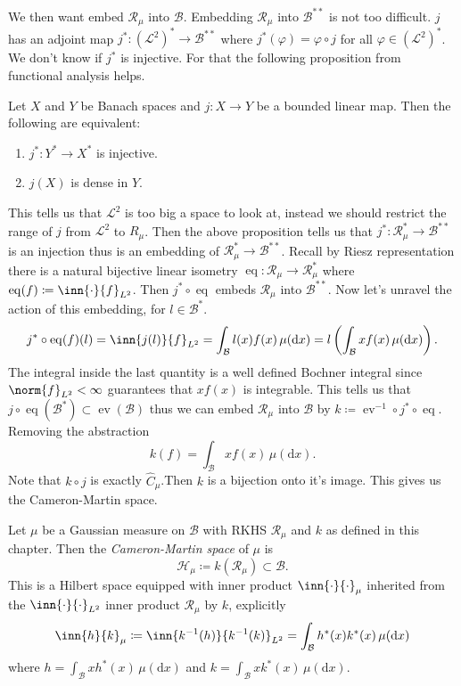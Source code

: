 \documentclass[fontsize=12pt, DIV=10]{scrreprt}
\theoremstyle{remark}
\newcommand{\defeq}{\coloneqq}
\newcommand{\calB}{\mathcal B}
\newcommand{\calH}{\mathcal H}
\newcommand{\calL}{\mathcal L}
\newcommand{\calR}{\mathcal R}
\newcommand{\dif}[1]{\text{d} #1}
\DeclareMathOperator{\ev}{ev}
\DeclareMathOperator{\eq}{eq}
\renewcommand{\phi}{\varphi}
\newcommand{\mudif}{\ensuremath{\, \mu(\dif x)}}
\begin{document}
We then want embed $\calR_{\mu}$ into $\calB$. Embedding $\calR_{\mu}$ into $\calB^{**}$ is not too difficult. $j$ has an adjoint map $j^*: (\calL^2)^* \to \calB^{**}$ where $j^*(\phi) = \phi \circ j$ for all $\phi \in (\calL^2)^*$. We don't know if $j^*$ is injective. For that the following proposition from functional analysis helps.
\begin{prop}
	Let $X$ and $Y$ be Banach spaces and $j:X \to Y$ be a bounded linear map. Then the following are equivalent:
	\begin{enumerate}
		\item $j^*: Y^* \to X^*$ is injective.
		\item $j(X)$ is dense in $Y$.
	\end{enumerate}
\end{prop}
This tells us that $\calL^2$ is too big a space to look at, instead we should restrict the range of $j$ from $\calL^2$ to $R_{\mu}$. Then the above proposition tells us that $j^*: \calR_{\mu}^* \to \calB^{**}$ is an injection thus is an embedding of $\calR_{\mu}^* \to \calB^{**}$. Recall by Riesz representation there is a natural bijective linear isometry $\eq : \calR_{\mu} \to \calR_{\mu}^*$ where $\eq(f) \defeq \inn{\cdot}{f}_{L^2}$. Then $j^* \circ \eq$ embeds $\calR_{\mu}$ into $\calB^{**}$. Now let's unravel the action of this embedding, for $l \in \calB^*$.
\begin{align}
	j^* \circ \eq (f)(l) = \inn{j(l)}{f}_{L^2} = \int_{\calB} l(x) f(x) \mudif = l\left(\int_{\calB} x f(x) \mudif \right).
\end{align}
The integral inside the last quantity is a well defined Bochner integral since $\norm{f}_{L^2} < \infty$ guarantees that $x f(x)$ is integrable. This tells us that $j \circ \eq(\calB^*) \subset \ev(\calB)$ thus we can embed $\calR_{\mu}$ into $\calB$ by $k \defeq \ev^{-1} \circ j^* \circ \eq$. Removing the abstraction
\begin{equation}
	k(f) = \int_{\calB} x f(x) \mudif.
\end{equation}
Note that $k \circ j$ is exactly $\hat{C}_{\mu}$.Then $k$ is a bijection onto it's image. This gives us the Cameron-Martin space.
\begin{defn}
	Let $\mu$ be a Gaussian measure on $\calB$ with RKHS $\calR_{\mu}$ and $k$ as defined in this chapter. Then the \emph{Cameron-Martin space} of $\mu$ is
	\begin{equation}
		\calH_{\mu} \defeq k(\calR_{\mu}) \subset \calB.
	\end{equation}
	This is a Hilbert space equipped with inner product $\inn{\cdot}{\cdot}_{\mu}$ inherited from the $\inn{\cdot}{\cdot}_{L^2}$ inner product $\calR_{\mu}$ by $k$, explicitly
	\begin{equation}
		\inn{h}{k}_{\mu} \defeq \inn{k^{-1}(h)}{k^{-1}(k)}_{L^2}
		= \int_{\calB} h^*(x) k^*(x) \mudif
	\end{equation}
	where $h = \int_{\calB} x h^*(x) \mudif$ and $k = \int_{\calB} x k^*(x) \mudif$.
\end{defn}
\end{document}
